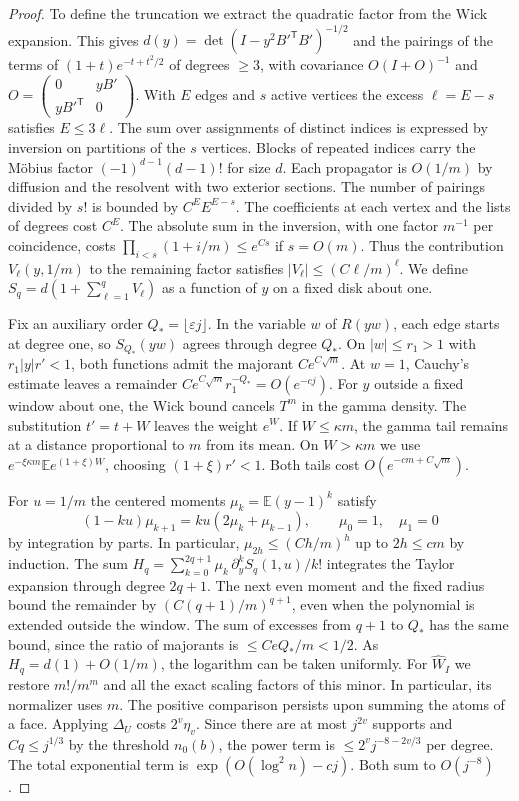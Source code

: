 \begin{proof}
To define the truncation we extract the quadratic factor from the Wick expansion. This gives
\(d(y)=\det(I-y^2 B'^{\mathsf T}B')^{-1/2}\) and the pairings of the terms of \((1+t)e^{-t+t^2/2}\) of
degrees \(\ge3\), with covariance \(O(I+O)^{-1}\) and \(O=\left(\begin{smallmatrix}0&yB'\\yB'^{\mathsf
T}&0\end{smallmatrix}\right)\). With \(E\) edges and \(s\) active vertices the excess \(\ell=E-s\)
satisfies \(E\le3\ell\). The sum over assignments of distinct indices is expressed by inversion on
partitions of the \(s\) vertices. Blocks of repeated indices carry the Möbius factor \((-1)^{d-1}(d-1)!\)
for size \(d\). Each propagator is \(O(1/m)\) by diffusion and the resolvent with two exterior
sections. The number of pairings divided by \(s!\) is bounded by \(C^E E^{E-s}\). The coefficients at
each vertex and the lists of degrees cost \(C^E\). The absolute sum in the inversion, with one factor
\(m^{-1}\) per coincidence, costs \(\prod_{i<s}(1+i/m)\le e^{Cs}\) if \(s=O(m)\). Thus the contribution
\(V_\ell(y,1/m)\) to the remaining factor satisfies \(|V_\ell|\le(C\ell/m)^\ell\). We define
\(S_q=d(1+\sum_{\ell=1}^q V_\ell)\) as a function of \(y\) on a fixed disk about one.

Fix an auxiliary order \(Q_*=\lfloor\varepsilon j\rfloor\). In the variable \(w\) of \(R(yw)\), each edge
starts at degree one, so \(S_{Q_*}(yw)\) agrees through degree \(Q_*\). On \(|w|\le r_1>1\) with
\(r_1|y|r'<1\), both functions admit the majorant \(Ce^{C\sqrt m}\). At \(w=1\), Cauchy's estimate leaves
a remainder \(Ce^{C\sqrt m}r_1^{-Q_*}=O(e^{-cj})\). For \(y\) outside a fixed window about one, the Wick
bound cancels \(T^m\) in the gamma density. The substitution \(t'=t+W\) leaves the weight \(e^W\). If
\(W\le\kappa m\), the gamma tail remains at a distance proportional to \(m\) from its mean. On \(W>\kappa
m\) we use \(e^{-\xi\kappa m}\mathbb E e^{(1+\xi)W}\), choosing \((1+\xi)r'<1\). Both tails cost
\(O(e^{-cm+C\sqrt m})\).

For \(u=1/m\) the centered moments \(\mu_k=\mathbb E(y-1)^k\) satisfy
\[
 (1-ku)\mu_{k+1}=ku(2\mu_k+\mu_{k-1}),\qquad \mu_0=1,\quad\mu_1=0
\]
by integration by parts. In particular, \(\mu_{2h}\le(Ch/m)^h\) up to \(2h\le c m\) by induction. The sum
\(H_q=\sum_{k=0}^{2q+1}\mu_k\,\partial_y^k S_q(1,u)/k!\) integrates the Taylor expansion through degree
\(2q+1\). The next even moment and the fixed radius bound the remainder by \((C(q+1)/m)^{q+1}\), even
when the polynomial is extended outside the window. The sum of excesses from \(q+1\) to \(Q_*\) has the
same bound, since the ratio of majorants is \(\le Ce Q_*/m<1/2\). As \(H_q=d(1)+O(1/m)\), the logarithm
can be taken uniformly. For \(\widehat W_I\) we restore \(m!/m^m\) and all the exact scaling factors of
this minor. In particular, its normalizer uses \(m\). The positive comparison persists upon summing the
atoms of a face. Applying \(\Delta_U\) costs \(2^v\eta_v\). Since there are at most \(j^{2v}\) supports
and \(Cq\le j^{1/3}\) by the threshold \(n_0(b)\), the power term is \(\le2^v j^{-8-2v/3}\) per degree.
The total exponential term is \(\exp(O(\log^2 n)-cj)\). Both sum to \(O(j^{-8})\).
\end{proof}
